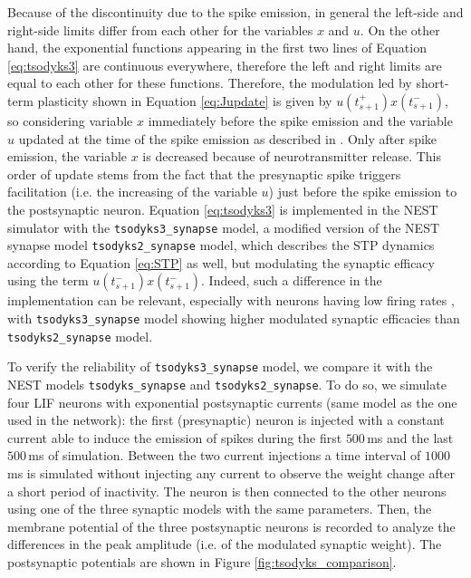 \documentclass[a4paper, 12pt, twoside, openright]{book}
\begin{document}
Because of the discontinuity due to the spike emission, in general the left-side and right-side limits differ from each other for the variables $x$ and $u$. On the other hand, the exponential functions appearing in the first two lines of Equation \eqref{eq:tsodyks3} are continuous everywhere, therefore the left and right limits are equal to each other for these functions. Therefore, the modulation led by short-term plasticity shown in Equation \eqref{eq:Jupdate} is given by $u(t_{s+1}^+)x(t_{s+1}^-)$, so considering variable $x$ immediately before the spike emission and the variable $u$ updated at the time of the spike emission as described in \cite{tsodyks1998}. Only after spike emission, the variable $x$ is decreased because of neurotransmitter release. This order of update stems from the fact that the presynaptic spike triggers facilitation (i.e. the increasing of the variable $u$) just before the spike emission to the postsynaptic neuron. Equation \eqref{eq:tsodyks3} is implemented in the NEST simulator with the \texttt{tsodyks3\_synapse} model, a modified version of the NEST synapse model \texttt{tsodyks2\_synapse} model, which describes the STP dynamics according to Equation \eqref{eq:STP} as well, but modulating the synaptic efficacy using the term $u(t_{s+1}^-)x(t_{s+1}^-)$. Indeed, such a difference in the implementation can be relevant, especially with neurons having low firing rates \cite{Gast2021}, with \texttt{tsodyks3\_synapse} model showing higher modulated synaptic efficacies than \texttt{tsodyks2\_synapse} model.


To verify the reliability of \texttt{tsodyks3\_synapse} model, we compare it with the NEST models \texttt{tsodyks\_synapse} and \texttt{tsodyks2\_synapse}. To do so, we simulate four LIF neurons with exponential postsynaptic currents (same model as the one used in the network): the first (presynaptic) neuron is injected with a constant current able to induce the emission of spikes during the first $500$\,ms and the last $500$\,ms of simulation. Between the two current injections a time interval of $1000$\,ms is simulated without injecting any current to observe the weight change after a short period of inactivity. The neuron is then connected to the other neurons using one of the three synaptic models with the same parameters. Then, the membrane potential of the three postsynaptic neurons is recorded to analyze the differences in the peak amplitude (i.e. of the modulated synaptic weight). The postsynaptic potentials are shown in Figure \ref{fig:tsodyks_comparison}.
\end{document}

